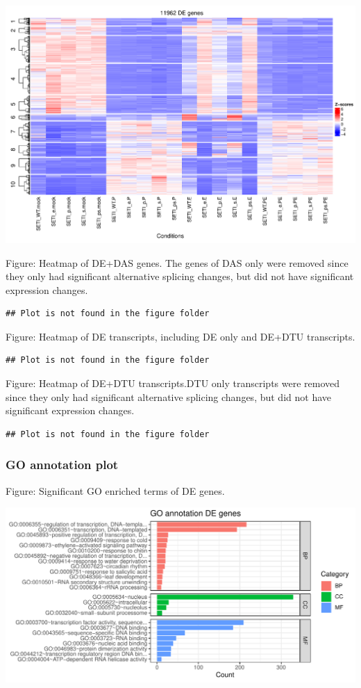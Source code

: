 \documentclass[]{article}
\begin{document}
\includegraphics[width=24.58in]{X2025.01.13.16.34.12.j145/figure/Heatmap DE genes}

Figure: Heatmap of DE+DAS genes. The genes of DAS only were removed
since they only had significant alternative splicing changes, but did
not have significant expression changes.

\begin{verbatim}
## Plot is not found in the figure folder
\end{verbatim}

Figure: Heatmap of DE transcripts, including DE only and DE+DTU
transcripts.

\begin{verbatim}
## Plot is not found in the figure folder
\end{verbatim}

Figure: Heatmap of DE+DTU transcripts.DTU only transcripts were removed
since they only had significant alternative splicing changes, but did
not have significant expression changes.

\begin{verbatim}
## Plot is not found in the figure folder
\end{verbatim}

\subsubsection{GO annotation plot}\label{go-annotation-plot}

Figure: Significant GO enriched terms of DE genes.

\includegraphics[width=16.25in]{X2025.01.13.16.34.12.j145/figure/DE genes GO annotation plot}
\end{document}
